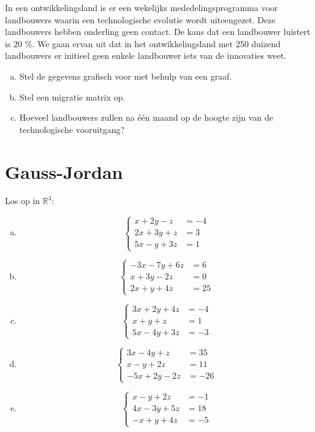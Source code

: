 \documentclass[12pt,twoside]{article}
\begin{document}
\begin{oefening}
In een ontwikkelingsland is er een wekelijks mededelingsprogramma voor landbouwers waarin een technologische evolutie wordt uiteengezet. Deze landbouwers hebben onderling geen contact. De kans dat een landbouwer luistert is $20$ \%. We gaan ervan uit dat in het ontwikkelingsland met 250 duizend landbouwers er initieel geen enkele landbouwer iets van de innovaties weet.

\begin{enumerate}[(a)]
  \item Stel de gegevens grafisch voor met behulp van een graaf.
  \item Stel een migratie matrix op.
  \item Hoeveel landbouwers zullen na één maand op de hoogte zijn van de technologische vooruitgang?
\end{enumerate}
\end{oefening}

\pagebreak
\section{Gauss-Jordan}

\begin{oefening}
Los op in $\mathbb{R}^3$:
\begin{multicols}{2}
\begin{enumerate}[(a)]
  \item$$\left\{
\begin{aligned}
  x + 2y -z &= -4\\
  2x+3y+z   &= 3\\
  5x-y+3z   &= 1
\end{aligned}\right.$$
  \item$$\left\{
\begin{aligned}
  -3x -7y +6z &= 6\\
  x+3y-2z   &= 0\\
  2x+y+4z   &= 25
\end{aligned}\right.$$
  \item$$\left\{
\begin{aligned}
  3x +2y +4z &= -4\\
  x+y+z   &= 1\\
  5x-4y+3z   &= -3
\end{aligned}\right.$$
  \item$$\left\{
\begin{aligned}
  3x -4y +z &= 35\\
  x-y+2z   &= 11\\
  -5x+2y-2z   &= -26
\end{aligned}\right.$$
  \item$$\left\{
\begin{aligned}
  x -y + 2z &= -1\\
  4x-3y+5z   &= 18\\
  -x+y+4z   &= -5
\end{aligned}\right.$$
\end{enumerate}
\end{multicols}
\end{oefening}
\end{document}
